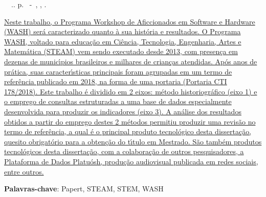 \setlength{\absparsep}{18pt} %
\begin{resumo}
\begin{flushleft} 
\setlength{\absparsep}{0pt} %
\SingleSpacing 
\imprimirautorabr~~\textbf{\imprimirtituloresumo}.\imprimirdata. \pageref{LastPage}p. 
\imprimirtipotrabalho~-~\imprimirinstituicao, \imprimirlocal, \imprimirdata. 
 \end{flushleft}
\OnehalfSpacing 
\ul{Neste trabalho, o Programa Workshop de Aficcionados em Software e Hardware (WASH) ser\'a caracterizado quanto \`a sua hist\'oria e resultados. O Programa WASH, voltado para educa\c{c}\~ao em Ci\^encia, Tecnologia, Engenharia, Artes e Matem\'atica (STEAM) vem sendo executado desde 2013, com presen\c{c}a em dezenas de munic\'{\i}pios brasileiros e milhares de crian\c{c}as atendidas. Ap\'os anos de pr\'atica, suas caracter\'{\i}sticas principais foram agrupadas em um termo de refer\^encia publicado em 2018, na forma de uma portaria (Portaria CTI 178/2018). Este trabalho \'e dividido em 2 eixos: m\'etodo historiogr\'afico (eixo 1) e o emprego de consultas estruturadas a uma base de dados especialmente desenvolvida para produzir os indicadores (eixo 3). A an\'alise dos resultados obtidos a partir do emprego destes 2 m\'etodos permitiu produzir uma revis\~ao no termo de refer\^encia, a qual \'e o principal produto tecnol\'ogico desta disserta\c{c}\~ao, quesito obrigat\'orio para a obten\c{c}\~ao do t\'{\i}tulo em Mestrado. S\~ao tamb\'em produtos tecnol\'ogicos desta disserta\c{c}\~ao, com a colabora\c{c}\~ao de outros pesquisadores, a Plataforma de Dados Platu\'osh, produ\c{c}\~ao audiovisual publicada em redes sociais, entre outros.}
 

 \textbf{Palavras-chave}: Papert, STEAM, STEM, WASH
\end{resumo}